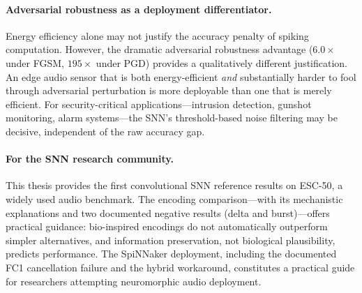 \paragraph{Adversarial robustness as a deployment differentiator.}
Energy efficiency alone may not justify the accuracy penalty of spiking computation. However, the dramatic adversarial robustness advantage ($6.0\times$ under FGSM, $195\times$ under PGD) provides a qualitatively different justification. An edge audio sensor that is both energy-efficient \emph{and} substantially harder to fool through adversarial perturbation is more deployable than one that is merely efficient. For security-critical applications---intrusion detection, gunshot monitoring, alarm systems---the SNN's threshold-based noise filtering may be decisive, independent of the raw accuracy gap.

\paragraph{For the SNN research community.}
This thesis provides the first convolutional SNN reference results on ESC-50, a widely used audio benchmark. The encoding comparison---with its mechanistic explanations and two documented negative results (delta and burst)---offers practical guidance: bio-inspired encodings do not automatically outperform simpler alternatives, and information preservation, not biological plausibility, predicts performance. The SpiNNaker deployment, including the documented FC1 cancellation failure and the hybrid workaround, constitutes a practical guide for researchers attempting neuromorphic audio deployment.
